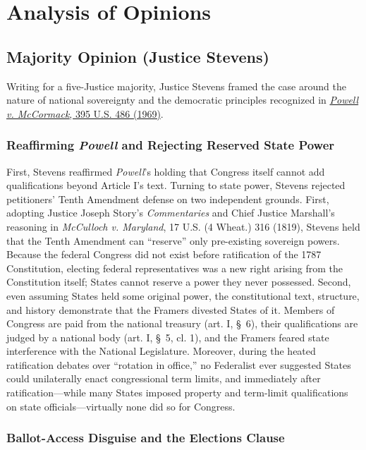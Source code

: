 \documentclass[12pt]{article}
\begin{document}
\section{Analysis of Opinions}
\subsection{Majority Opinion (Justice Stevens)}

Writing for a five-Justice majority, Justice Stevens framed the case around the nature of national sovereignty and the democratic principles recognized in \href{https://supreme.justia.com/cases/federal/us/395/486/}{\textit{Powell v. McCormack}, 395 U.S. 486 (1969)}.

\subsubsection{Reaffirming \textit{Powell} and Rejecting Reserved State Power}

First, Stevens reaffirmed \textit{Powell}'s holding that Congress itself cannot add qualifications beyond Article I's text. Turning to state power, Stevens rejected petitioners' Tenth Amendment defense on two independent grounds. First, adopting Justice Joseph Story's \textit{Commentaries} and Chief Justice Marshall's reasoning in \textit{McCulloch v. Maryland}, 17 U.S. (4 Wheat.) 316 (1819), Stevens held that the Tenth Amendment can ``reserve'' only pre-existing sovereign powers. Because the federal Congress did not exist before ratification of the 1787 Constitution, electing federal representatives was a new right arising from the Constitution itself; States cannot reserve a power they never possessed. Second, even assuming States held some original power, the constitutional text, structure, and history demonstrate that the Framers divested States of it. Members of Congress are paid from the national treasury (art. I, \S~6), their qualifications are judged by a national body (art. I, \S~5, cl. 1), and the Framers feared state interference with the National Legislature. Moreover, during the heated ratification debates over ``rotation in office,'' no Federalist ever suggested States could unilaterally enact congressional term limits, and immediately after ratification---while many States imposed property and term-limit qualifications on state officials---virtually none did so for Congress.

\subsubsection{Ballot-Access Disguise and the Elections Clause}
\end{document}
